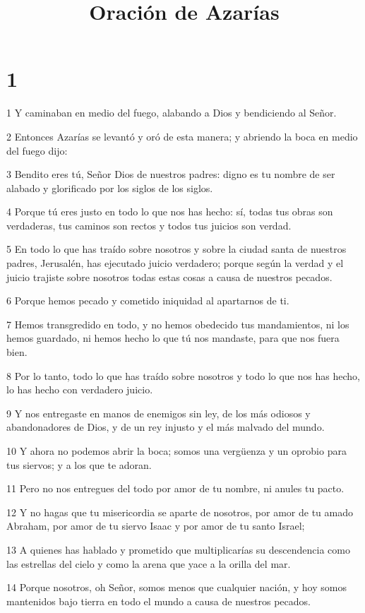 

\title{Oración de Azarías}


\chapter{1}

\par 1 Y caminaban en medio del fuego, alabando a Dios y bendiciendo al Señor.
\par 2 Entonces Azarías se levantó y oró de esta manera; y abriendo la boca en medio del fuego dijo:
\par 3 Bendito eres tú, Señor Dios de nuestros padres: digno es tu nombre de ser alabado y glorificado por los siglos de los siglos.
\par 4 Porque tú eres justo en todo lo que nos has hecho: sí, todas tus obras son verdaderas, tus caminos son rectos y todos tus juicios son verdad.
\par 5 En todo lo que has traído sobre nosotros y sobre la ciudad santa de nuestros padres, Jerusalén, has ejecutado juicio verdadero; porque según la verdad y el juicio trajiste sobre nosotros todas estas cosas a causa de nuestros pecados.
\par 6 Porque hemos pecado y cometido iniquidad al apartarnos de ti.
\par 7 Hemos transgredido en todo, y no hemos obedecido tus mandamientos, ni los hemos guardado, ni hemos hecho lo que tú nos mandaste, para que nos fuera bien.
\par 8 Por lo tanto, todo lo que has traído sobre nosotros y todo lo que nos has hecho, lo has hecho con verdadero juicio.
\par 9 Y nos entregaste en manos de enemigos sin ley, de los más odiosos y abandonadores de Dios, y de un rey injusto y el más malvado del mundo.
\par 10 Y ahora no podemos abrir la boca; somos una vergüenza y un oprobio para tus siervos; y a los que te adoran.
\par 11 Pero no nos entregues del todo por amor de tu nombre, ni anules tu pacto.
\par 12 Y no hagas que tu misericordia se aparte de nosotros, por amor de tu amado Abraham, por amor de tu siervo Isaac y por amor de tu santo Israel;
\par 13 A quienes has hablado y prometido que multiplicarías su descendencia como las estrellas del cielo y como la arena que yace a la orilla del mar.
\par 14 Porque nosotros, oh Señor, somos menos que cualquier nación, y hoy somos mantenidos bajo tierra en todo el mundo a causa de nuestros pecados.
